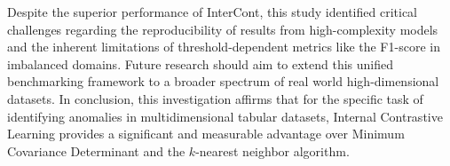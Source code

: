 Despite the superior performance of InterCont, this study identified critical challenges regarding the reproducibility of results from high-complexity models and the inherent limitations of threshold-dependent metrics like the F1-score in imbalanced domains. 
Future research should aim to extend this unified benchmarking framework to a broader spectrum of real world high-dimensional datasets. 
In conclusion, this investigation affirms that for the specific task of identifying anomalies in multidimensional tabular datasets, Internal Contrastive Learning provides a significant and measurable advantage over Minimum Covariance Determinant and the $k$-nearest neighbor algorithm.

